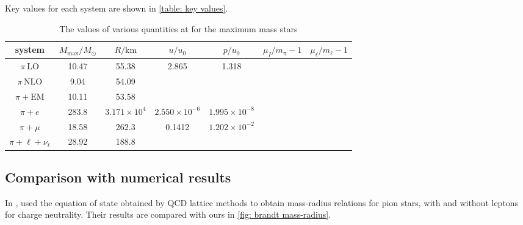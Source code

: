 Key values for each system are shown in \autoref{table: key values}.


\begin{table}[!htb]
    \centering
    \caption{The values of various quantities at for the maximum mass stars}
    \label{table: key values}
    \begin{tabular}{c  c  c  c  c c c}
        \hline \hline
        system & $M_\text{max}/M_\odot$ & $R / \text{km}$ & $u/u_0$ & $p/u_0$ & $\mu_I/m_\pi-1$ & $\mu_\ell/m_\ell-1$ \\
        \hline
        $\pi\, \text{LO}$& 10.47 & 55.38 & 2.865 & 1.318 && \\
        $\pi\, \text{NLO}$& 9.04 & 54.09 &  &  && \\
        $\pi + \text{EM}$& 10.11 & 53.58 &&&& \\
        $\pi + e$& 283.8 & $3.171 \times10^4$ & $2.550\times10^{-6}$ & $1.995\times10^{-8}$ && \\
        $\pi + \mu$& 18.58 & 262.3 & 0.1412 & $1.202\times 10^{-2}$ && \\
        $\pi + \ell + \nu_\ell$& 28.92 & 188.8 &  &  && \\
        \hline
    \end{tabular}
\end{table}



\subsection{Comparison with numerical results}

In \autocite{brandtNewClassCompact2018}, \citeauthor{brandtNewClassCompact2018} used the equation of state obtained by QCD lattice methods to obtain mass-radius relations for pion stars, with and without leptons for charge neutrality.
Their results are compared with ours in  \autoref{fig: brandt mass-radius}.


